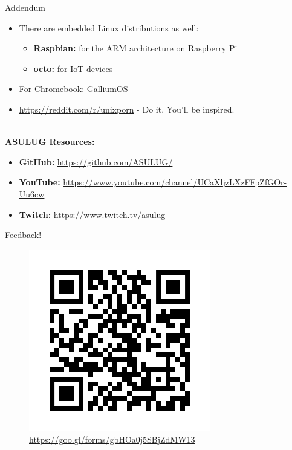\documentclass[11pt]{beamer}
\begin{document}
\begin{frame}{Addendum}
	\begin{itemize}
		\item There are embedded Linux distributions as well:
		\begin{itemize}
			\item \textbf{Raspbian:} for the ARM architecture on Raspberry Pi
			\item \textbf{octo:} for IoT devices
		\end{itemize}
		\item For Chromebook: GalliumOS
		\item \url{https://reddit.com/r/unixporn} - Do it. You'll be inspired.
	\end{itemize}
	~\\
	\textbf{\LARGE ASULUG Resources:}
	\begin{itemize}
		\item \textbf{GitHub:} \url{https://github.com/ASULUG/}
		\item \textbf{YouTube:} \url{https://www.youtube.com/channel/UCaXljzLXzFFpZfGOr-Uu6cw}
		\item \textbf{Twitch:} \url{https://www.twitch.tv/asulug}
	\end{itemize}
\end{frame}

\begin{frame}{Feedback!}
	\begin{figure}
		\includegraphics[scale=0.5]{qr-code.png}
		\caption{\url{https://goo.gl/forms/gbHOa0j5SBjZdMW13}}
	\end{figure}
\end{frame}
\end{document}
